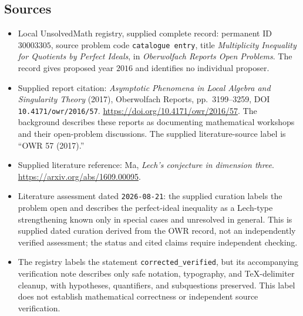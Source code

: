 \documentclass[11pt]{article}
\begin{document}
\subsection{Sources}
\begin{itemize}
\item Local UnsolvedMath registry, supplied complete record: permanent ID \(30003305\), source problem code \texttt{catalogue entry}, title \emph{Multiplicity Inequality for Quotients by Perfect Ideals}, in \emph{Oberwolfach Reports Open Problems}. The record gives proposed year \(2016\) and identifies no individual proposer.
\item Supplied report citation: \emph{Asymptotic Phenomena in Local Algebra and Singularity Theory} (2017), Oberwolfach Reports, pp.\ 3199--3259, DOI \texttt{10.4171/owr/2016/57}. \url{https://doi.org/10.4171/owr/2016/57}. The background describes these reports as documenting mathematical workshops and their open-problem discussions. The supplied literature-source label is ``OWR 57 (2017).''
\item Supplied literature reference: Ma, \emph{Lech's conjecture in dimension three}. \url{https://arxiv.org/abs/1609.00095}.
\item Literature assessment dated \texttt{2026-08-21}: the supplied curation labels the problem open and describes the perfect-ideal inequality as a Lech-type strengthening known only in special cases and unresolved in general. This is supplied dated curation derived from the OWR record, not an independently verified assessment; the status and cited claims require independent checking.
\item The registry labels the statement \texttt{corrected\_verified}, but its accompanying verification note describes only safe notation, typography, and TeX-delimiter cleanup, with hypotheses, quantifiers, and subquestions preserved. This label does not establish mathematical correctness or independent source verification.
\end{itemize}
\end{document}
